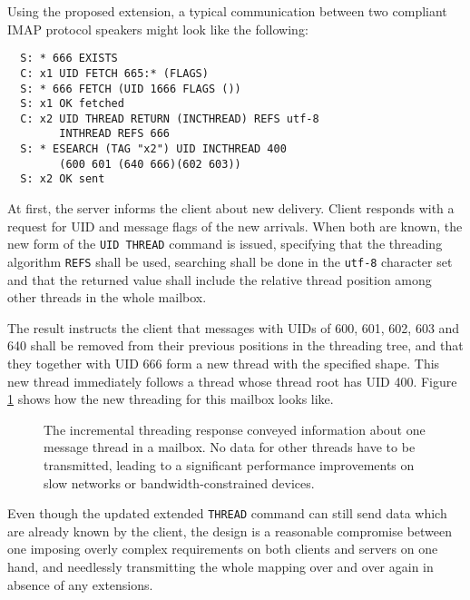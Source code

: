 \documentclass[trojita]{subfiles}
\begin{document}
Using the proposed extension, a typical communication between two compliant IMAP protocol speakers might look like the
following:

\begin{verbatim}
  S: * 666 EXISTS
  C: x1 UID FETCH 665:* (FLAGS)
  S: * 666 FETCH (UID 1666 FLAGS ())
  S: x1 OK fetched
  C: x2 UID THREAD RETURN (INCTHREAD) REFS utf-8
        INTHREAD REFS 666
  S: * ESEARCH (TAG "x2") UID INCTHREAD 400
        (600 601 (640 666)(602 603))
  S: x2 OK sent
\end{verbatim}

At first, the server informs the client about new delivery.  Client responds with a request for UID and message flags of
the new arrivals.  When both are known, the new form of the {\tt UID THREAD} command is issued, specifying that the
threading algorithm {\tt REFS} shall be used, searching shall be done in the {\tt utf-8} character set and that the
returned value shall include the relative thread position among other threads in the whole mailbox.

The result instructs the client that messages with UIDs of 600, 601, 602, 603 and 640 shall be removed from their
previous positions in the threading tree, and that they together with UID 666 form a new thread with the specified
shape.  This new thread immediately follows a thread whose thread root has UID 400.  Figure
\ref{fig:incthread-threading-example} shows how the new threading for this mailbox looks like.

\begin{figure}
\vspace{10mm}
\vspace{8mm}
  \label{fig:incthread-threading-example}
  \caption{The incremental threading response conveyed information about one message thread in a mailbox.  No data for
  other threads have to be transmitted, leading to a significant performance improvements on slow networks or
  bandwidth-constrained devices.}
\end{figure}

Even though the updated extended {\tt THREAD} command can still send data which are already known by the client, the
design is a reasonable compromise between one imposing overly complex requirements on both clients and servers on one
hand, and needlessly transmitting the whole mapping over and over again in absence of any extensions.
\end{document}
